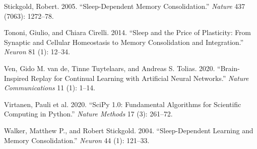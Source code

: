 \documentclass[
]{article}
\newlength{\cslhangindent}
\newenvironment{CSLReferences}[2] %
 {\begin{list}{}{%
  \setlength{\itemindent}{0pt}
  \setlength{\leftmargin}{0pt}
  \setlength{\parsep}{0pt}
  \ifodd #1
   \setlength{\leftmargin}{\cslhangindent}
   \setlength{\itemindent}{-1\cslhangindent}
  \fi
  \setlength{\itemsep}{#2\baselineskip}}}
 {\end{list}}
\begin{document}
\begin{CSLReferences}{1}{1}
Stickgold, Robert. 2005. {``Sleep-Dependent Memory Consolidation.''}
\emph{Nature} 437 (7063): 1272--78.

Tononi, Giulio, and Chiara Cirelli. 2014. {``Sleep and the Price of
Plasticity: From Synaptic and Cellular Homeostasis to Memory
Consolidation and Integration.''} \emph{Neuron} 81 (1): 12--34.

Ven, Gido M. van de, Tinne Tuytelaars, and Andreas S. Tolias. 2020.
{``Brain-Inspired Replay for Continual Learning with Artificial Neural
Networks.''} \emph{Nature Communications} 11 (1): 1--14.

{Virtanen, Pauli et al.} 2020. {``{SciPy} 1.0: Fundamental Algorithms
for Scientific Computing in {Python}.''} \emph{Nature Methods} 17 (3):
261--72.

Walker, Matthew P., and Robert Stickgold. 2004. {``Sleep-Dependent
Learning and Memory Consolidation.''} \emph{Neuron} 44 (1): 121--33.

\end{CSLReferences}
\end{document}

